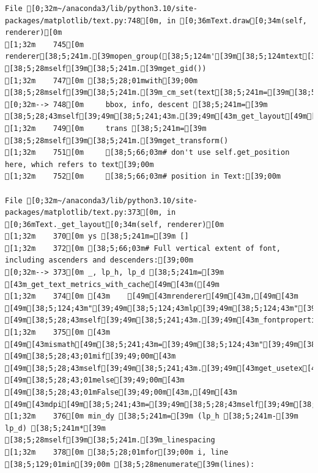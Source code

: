 \documentclass[
  letterpaper,
  DIV=11,
  numbers=noendperiod]{scrartcl}
\begin{document}
\begin{verbatim}
File [0;32m~/anaconda3/lib/python3.10/site-packages/matplotlib/text.py:748[0m, in [0;36mText.draw[0;34m(self, renderer)[0m
[1;32m    745[0m renderer[38;5;241m.[39mopen_group([38;5;124m'[39m[38;5;124mtext[39m[38;5;124m'[39m, [38;5;28mself[39m[38;5;241m.[39mget_gid())
[1;32m    747[0m [38;5;28;01mwith[39;00m [38;5;28mself[39m[38;5;241m.[39m_cm_set(text[38;5;241m=[39m[38;5;28mself[39m[38;5;241m.[39m_get_wrapped_text()):
[0;32m--> 748[0m     bbox, info, descent [38;5;241m=[39m [38;5;28;43mself[39;49m[38;5;241;43m.[39;49m[43m_get_layout[49m[43m([49m[43mrenderer[49m[43m)[49m
[1;32m    749[0m     trans [38;5;241m=[39m [38;5;28mself[39m[38;5;241m.[39mget_transform()
[1;32m    751[0m     [38;5;66;03m# don't use self.get_position here, which refers to text[39;00m
[1;32m    752[0m     [38;5;66;03m# position in Text:[39;00m

File [0;32m~/anaconda3/lib/python3.10/site-packages/matplotlib/text.py:373[0m, in [0;36mText._get_layout[0;34m(self, renderer)[0m
[1;32m    370[0m ys [38;5;241m=[39m []
[1;32m    372[0m [38;5;66;03m# Full vertical extent of font, including ascenders and descenders:[39;00m
[0;32m--> 373[0m _, lp_h, lp_d [38;5;241m=[39m [43m_get_text_metrics_with_cache[49m[43m([49m
[1;32m    374[0m [43m    [49m[43mrenderer[49m[43m,[49m[43m [49m[38;5;124;43m"[39;49m[38;5;124;43mlp[39;49m[38;5;124;43m"[39;49m[43m,[49m[43m [49m[38;5;28;43mself[39;49m[38;5;241;43m.[39;49m[43m_fontproperties[49m[43m,[49m
[1;32m    375[0m [43m    [49m[43mismath[49m[38;5;241;43m=[39;49m[38;5;124;43m"[39;49m[38;5;124;43mTeX[39;49m[38;5;124;43m"[39;49m[43m [49m[38;5;28;43;01mif[39;49;00m[43m [49m[38;5;28;43mself[39;49m[38;5;241;43m.[39;49m[43mget_usetex[49m[43m([49m[43m)[49m[43m [49m[38;5;28;43;01melse[39;49;00m[43m [49m[38;5;28;43;01mFalse[39;49;00m[43m,[49m[43m [49m[43mdpi[49m[38;5;241;43m=[39;49m[38;5;28;43mself[39;49m[38;5;241;43m.[39;49m[43mfigure[49m[38;5;241;43m.[39;49m[43mdpi[49m[43m)[49m
[1;32m    376[0m min_dy [38;5;241m=[39m (lp_h [38;5;241m-[39m lp_d) [38;5;241m*[39m [38;5;28mself[39m[38;5;241m.[39m_linespacing
[1;32m    378[0m [38;5;28;01mfor[39;00m i, line [38;5;129;01min[39;00m [38;5;28menumerate[39m(lines):


\end{verbatim}
\end{document}
